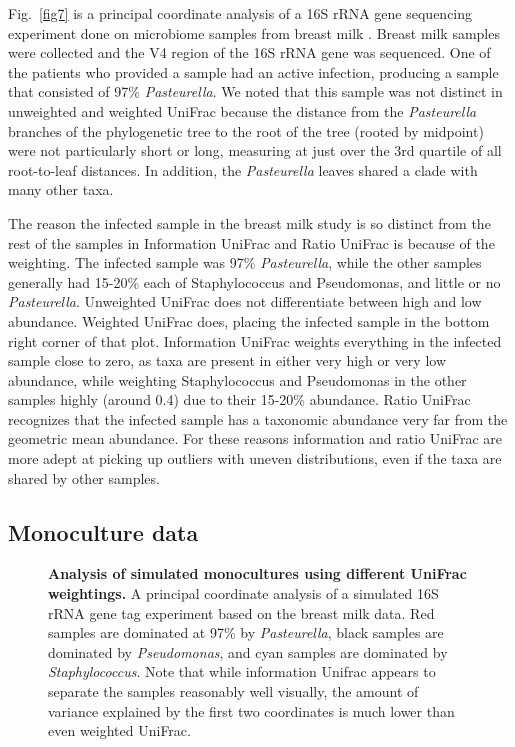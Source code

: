 \documentclass[10pt,letterpaper]{article}
\begin{document}
Fig.~\ref{fig7} is a principal coordinate analysis of a 16S rRNA gene sequencing experiment done on microbiome samples from breast milk \cite{urbaniak2016human}. Breast milk samples were collected and the V4 region of the 16S rRNA gene was sequenced. One of the patients who provided a sample had an active infection, producing a sample that consisted of 97\% \textit{Pasteurella}. We noted that this sample was not distinct in unweighted and weighted UniFrac because the distance from the \textit{Pasteurella} branches of the phylogenetic tree to the root of the tree (rooted by midpoint) were not particularly short or long, measuring at just over the 3rd quartile of all root-to-leaf distances. In addition, the \textit{Pasteurella} leaves shared a clade with many other taxa.

The reason the infected sample in the breast milk study is so distinct from the rest of the samples in Information UniFrac and Ratio UniFrac is because of the weighting. The infected sample was 97\% \textit{Pasteurella}, while the other samples generally had 15-20\% each of Staphylococcus and Pseudomonas, and little or no \textit{Pasteurella}. Unweighted UniFrac does not differentiate between high and low abundance. Weighted UniFrac does, placing the infected sample in the bottom right corner of that plot. Information UniFrac weights everything in the infected sample close to zero, as taxa are present in either very high or very low abundance, while weighting Staphylococcus and Pseudomonas in the other samples highly (around 0.4) due to their 15-20\% abundance. Ratio UniFrac recognizes that the infected sample has a taxonomic abundance very far from the geometric mean abundance. For these reasons information and ratio UniFrac are more adept at picking up outliers with uneven distributions, even if the taxa are shared by other samples.

\FloatBarrier

\subsection{Monoculture data}

\begin{figure}[h]
\caption[Analysis of simulated monocultures using different UniFrac weightings.]{{\bf Analysis of simulated monocultures using different UniFrac weightings. }
A principal coordinate analysis of a simulated 16S rRNA gene tag experiment based on the breast milk data. Red samples are dominated at 97\% by \textit{Pasteurella}, black samples are dominated by \textit{Pseudomonas}, and cyan samples are dominated by \textit{Staphylococcus}. Note that while information Unifrac appears to separate the samples reasonably well visually, the amount of variance explained by the first two coordinates is much lower than even weighted UniFrac.}
\label{fig8}
\end{figure}
\end{document}
